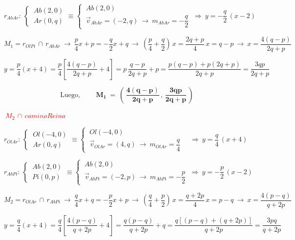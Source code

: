  $r_{AbAr}:\ \begin{cases} \ Ab(2,0)\\ \ Ar(0,q)\end{cases} \equiv \begin{cases} \ Ab(2,0)\\ \ \vec v_{AbAr}=(-2,q) \ \to \ m_{AbAr}=-\dfrac q 2 \end{cases}
 \ \Rightarrow \ y=-\dfrac q 2 \, (x-2)$

$M_1=r_{OlPi}\, \cap \, r_{AbAr} \ \to \ \dfrac p 4 x+p=-\dfrac q 2 x+q \ \to \ \left(\dfrac p4+\dfrac q2 \right)\, x=\dfrac{2q+p}{4}\, x= q-p  \ \to \ x=\dfrac{4(q-p)}{2q+p}$

$y=\dfrac p 4 (x+4)=\dfrac p 4 \left[ \dfrac{4(q-p)}{2q+p}+4\right]=p\, \dfrac{q-p}{2q+p}+p=\dfrac{p(q-p)+p(2q+p)}{2q+p}=\dfrac{3qp}{2q+p}$

$$ \text{Luego, } \qquad \boldsymbol{ M_1 \ = \ \left( \, \dfrac{4(q-p)}{2q+p}\, , \, \dfrac{3qp}{2q+p} \, \right) } $$



\vspace{5mm} \textcolor{red}{$\boxed{\ M_2 \, \cap \, caminoReina\ }$}

$r_{OlAr}:\, \begin{cases} \ Ol(-4,0) \\ \ Ar(0,q) \end{cases} \equiv \begin{cases} \ Ol(-4,0)\\ \ \vec v_{OlAr}=(4,q) \ \to \ m_{OlAr}=\dfrac{q}{4} \end{cases} \quad  \Rightarrow \ y=\dfrac q 4 \, (x+4)$

$r_{AbPi}:\, \begin{cases} \ Ab(2,0) \\ \ Pi(0,p) \end{cases} \equiv \begin{cases} \ Ab(2,0)\\ \ \vec v_{AbPi}=(-2,p) \ \to \ m_{AbPi}=-\dfrac{p}{2} \end{cases} \ \Rightarrow \ y=-\dfrac p 2 \, (x-2)$

$M_2 = r_{OlAr} \, \cap \, r_{AbPi} \ \to \ 
\dfrac q 4 x+q=-\dfrac p 2 x + p \ \to \ \left( \dfrac q 4 + \dfrac p 2 \right)\, x=\dfrac{q+2p}{4}\, x= p-q \ \to \ x=\dfrac{4(p-q)}{q+2p}$

$y=\dfrac q 4 (x+4)=\dfrac q 4 \left[\dfrac{4(p-q)}{q+2p} + 4 \right] = \dfrac{q(p-q)}{q+2p}+q=\dfrac{q[(p-q)+(q+2p)]}{q+2p}=\dfrac{3pq}{q+2p}$

